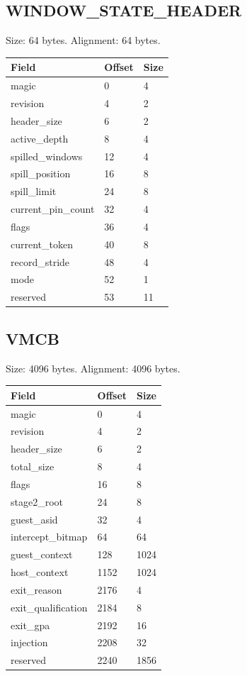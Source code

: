 \documentclass[10pt]{article}
\begin{document}
\subsection{WINDOW\_\allowbreak{}STATE\_\allowbreak{}HEADER}
Size: 64 bytes. Alignment: 64 bytes.
\begin{longtable}{@{}L{4cm}L{2cm}L{2cm}@{}}
\toprule Field & Offset & Size \\ \midrule
magic & 0 & 4 \\
revision & 4 & 2 \\
header\_\allowbreak{}size & 6 & 2 \\
active\_\allowbreak{}depth & 8 & 4 \\
spilled\_\allowbreak{}windows & 12 & 4 \\
spill\_\allowbreak{}position & 16 & 8 \\
spill\_\allowbreak{}limit & 24 & 8 \\
current\_\allowbreak{}pin\_\allowbreak{}count & 32 & 4 \\
flags & 36 & 4 \\
current\_\allowbreak{}token & 40 & 8 \\
record\_\allowbreak{}stride & 48 & 4 \\
mode & 52 & 1 \\
reserved & 53 & 11 \\
\bottomrule\end{longtable}
\subsection{VMCB}
Size: 4096 bytes. Alignment: 4096 bytes.
\begin{longtable}{@{}L{4cm}L{2cm}L{2cm}@{}}
\toprule Field & Offset & Size \\ \midrule
magic & 0 & 4 \\
revision & 4 & 2 \\
header\_\allowbreak{}size & 6 & 2 \\
total\_\allowbreak{}size & 8 & 4 \\
flags & 16 & 8 \\
stage2\_\allowbreak{}root & 24 & 8 \\
guest\_\allowbreak{}asid & 32 & 4 \\
intercept\_\allowbreak{}bitmap & 64 & 64 \\
guest\_\allowbreak{}context & 128 & 1024 \\
host\_\allowbreak{}context & 1152 & 1024 \\
exit\_\allowbreak{}reason & 2176 & 4 \\
exit\_\allowbreak{}qualification & 2184 & 8 \\
exit\_\allowbreak{}gpa & 2192 & 16 \\
injection & 2208 & 32 \\
reserved & 2240 & 1856 \\
\bottomrule\end{longtable}
\end{document}
